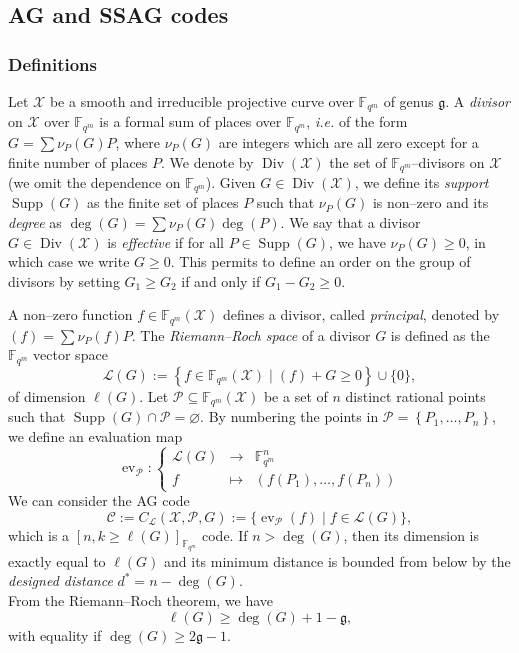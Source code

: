 \documentclass[peerreview]{IEEEtran}
\theoremstyle{plain}
\theoremstyle{definition}
\theoremstyle{remark}
\DeclareMathOperator{\ev}{ev}
\newcommand{\calP}{\mathcal{P}}
\newcommand{\calL}{\mathcal{L}}
\newcommand{\calC}{\mathcal{C}}
\newcommand{\calX}{\mathcal{X}}
\newcommand{\fqm}{\mathbb{F}_{q^m}}
\newcommand{\set}[1]{\left\{#1\right\}}
\newcommand{\Supp}{\operatorname{Supp}}
\newcommand{\Div}{\operatorname{Div}}
\begin{document}
	\subsection{AG and SSAG codes} \label{section:AG_codes}
	
	\subsubsection{Definitions}
	
	Let $\calX$ be a smooth and irreducible projective curve over $\fqm$ of genus $\mathfrak{g}$. A \emph{divisor} on $\calX$ over $\fqm$ is a formal sum of places over $\fqm$, \emph{i.e.} of the form $G=\sum \nu_P(G) P$, where $\nu_P(G)$ are integers which are all zero except for a finite number of places $P$. We denote by $\Div(\calX)$ the set of $\fqm$--divisors on $\calX$ (we omit the dependence on $\fqm$).
	Given $G \in \Div(\calX)$, we define its \emph{support} $\Supp(G)$ as the finite set of places $P$ such that $\nu_P(G)$ is non--zero and its \emph{degree} as $\deg(G)=\sum \nu_P(G) \deg(P)$. We say that a divisor $G \in \Div(\calX)$ is \emph{effective} if for all $P \in \Supp(G)$, we have $\nu_P(G) \geq 0$, in which case we write $G \geq 0$. This permits to define an order on the group of divisors by setting $G_1 \geq G_2$ if and only if $G_1-G_2 \geq 0$.
	
	
	A non--zero function $f \in \fqm(\calX)$ defines a divisor, called \emph{principal}, denoted by $(f)=\sum \nu_P(f) P$. The \emph{Riemann--Roch space} of a divisor $G$ is defined as the $\fqm$ vector space
	$$ \calL(G) := \set{f \in \fqm(\calX) \mid (f) + G \geq 0} \cup \{0\},$$
	of dimension $\ell(G)$.
	Let $\calP \subseteq \fqm(\calX)$ be a set of $n$ distinct rational points such that $\Supp(G) \cap \calP = \varnothing$. By numbering the points in $\calP=\set{P_1,\dots,P_n}$, we define an evaluation map
	\begin{equation}\label{eq:ev_P}
		\ev_{\calP} : \left\{\begin{array}{rcl}
			\calL(G) 	& \rightarrow & \fqm^n \\
			f 			& \mapsto	  &  (f(P_1),\dots,f(P_n)) 
		\end{array} \right.
	\end{equation}
	We can consider the AG code 
	\[\calC := C_{\calL}(\calX,\calP,G) := \{\ev_{\calP}(f) \mid f \in \calL(G)\},\]
	which is a $[n, k \geq \ell(G)]_{\fqm}$ code. If $n > \deg (G)$, then its dimension is exactly equal to $\ell(G)$ and its minimum distance is bounded from below by the \emph{designed distance} $d^*=n-\deg (G)$.\\
	From the Riemann--Roch theorem, we have
	$$ \ell(G) \geq \deg(G) +1 - \mathfrak{g},$$ 
	with equality if $\deg(G) \geq 2\mathfrak{g}-1$.\\
	
\end{document}

